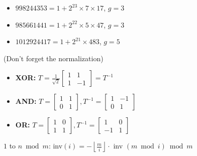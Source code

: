 \begin{itemize}
\item $998244353 = 1 + 2^{23} \times 7 \times 17$, $g = 3$
\item $985661441 = 1 + 2^{22} \times 5 \times 47$, $g = 3$
\item $1012924417 = 1 + 2^{21} \times 483$, $g = 5$
\end{itemize}

 (Don't forget the normalization)
\begin{itemize}
  \item \textbf{XOR:} $T = \frac{1}{\sqrt{2}}\begin{bmatrix} 1 & 1 \\ 1 & -1 \end{bmatrix} = T^{-1}$
  \item \textbf{AND:} $T = \begin{bmatrix} 1 & 1 \\ 0 & 1 \end{bmatrix}, T^{-1} = \begin{bmatrix} 1 & -1 \\ 0 & 1 \end{bmatrix}$
  \item \textbf{OR:} $T = \begin{bmatrix} 1 & 0 \\ 1 & 1 \end{bmatrix}, T^{-1} = \begin{bmatrix} 1 & 0 \\ -1 & 1 \end{bmatrix}$
\end{itemize}

 $1$ to $n \bmod m$: inv$(i) = - \left\lfloor \frac{m}{i} \right\rfloor \cdot$ inv $(m \bmod i) \bmod m$

